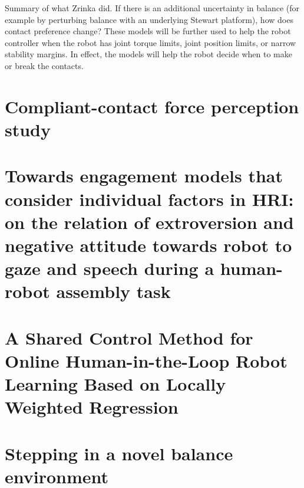 \documentclass[12pt,a4paper,twoside]{article}
\begin{document}
Summary of what Zrinka did. If there is an additional uncertainty in balance (for example by perturbing balance with an underlying Stewart platform), how does contact preference change? 
These models will be further used to help the robot controller when the robot has joint torque limits, joint position limits, or narrow stability margins. In effect, the models will help the robot decide when to make or break the contacts.




\newpage{}
\section{Compliant-contact force perception study}\label{sec:Chie}
\setcounter{figure}{0}

\clearpage{}

\section{Towards engagement models that consider individual factors in HRI: on the relation of extroversion and negative attitude towards robot to gaze and speech during a human-robot assembly task}\label{sec:Serena}
\setcounter{figure}{0}

\clearpage{}

\section{A Shared Control Method for Online Human-in-the-Loop Robot Learning Based on Locally Weighted Regression}\label{sec:Luka}
\setcounter{figure}{0}

\clearpage

\section{Stepping in a novel balance environment}\label{sec:Zrinka}
\setcounter{figure}{0}

\clearpage{}



\end{document}
